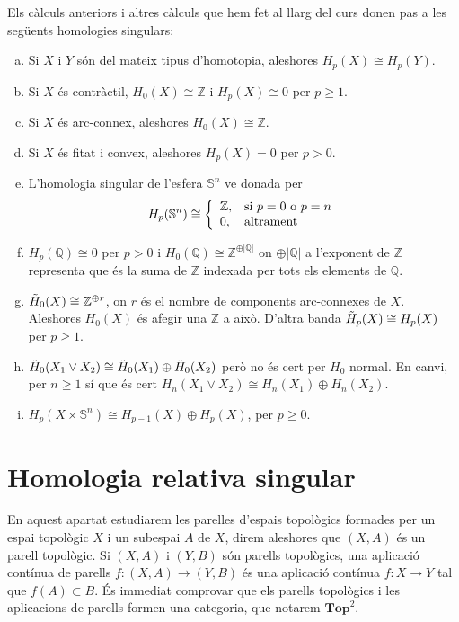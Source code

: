 \documentclass[../main.tex]{subfiles}
\begin{document}
\begin{prop}
 Els càlculs anteriors i altres càlculs que hem fet al llarg del curs donen pas a les següents homologies singulars:
\begin{enumerate}[(a)]
    \item Si $X$ i $Y$ són del mateix tipus d'homotopia, aleshores $H_p(X)\cong H_p(Y)$.
    \item Si $X$ és contràctil, $H_0(X)\cong \mathbb{Z}$ i $H_p(X)\cong 0$ per $p\geq 1$.
    \item Si $X$ és arc-connex, aleshores $H_0(X)\cong\mathbb{Z}$.
    \item Si $X$ és fitat i convex, aleshores $H_p(X) = 0$ per $p>0$.
    \item L'homologia singular de l'esfera $\mathbb{S}^n$ ve donada per
    \begin{equation}
        \notag
        H_p(\mathbb{S}^n)\cong\left\{
        \begin{array}{ll}
            \mathbb{Z}, & \text{si $p = 0$ o $p = n$}\\
            0, & \text{altrament}
        \end{array}
        \right.
    \end{equation}
    \item $H_p(\mathbb{Q})\cong 0$ per $p>0$ i $H_0(\mathbb{Q})\cong\mathbb{Z}^{\oplus|\mathbb{Q}|}$ on $\oplus|\mathbb{Q}|$ a l'exponent de $\mathbb{Z}$ representa que és la suma de $\mathbb{Z}$ indexada per tots els elements de $\mathbb{Q}$.
    \item $\Tilde{H}_0(X)\cong \mathbb{Z}^{\oplus r}$, on $r$ és el nombre de components arc-connexes de $X$. Aleshores $H_0(X)$ és afegir una $\mathbb{Z}$ a això. D'altra banda $\Tilde{H}_p(X)\cong H_p(X)$ per $p\geq 1$.
    \item $\Tilde{H}_0(X_1\vee X_2)\cong \Tilde{H}_0(X_1)\oplus \Tilde{H}_0(X_2)$ però no és cert per $H_0$ normal. En canvi, per $n\geq 1$ sí que és cert $H_n(X_1\vee X_2)\cong H_n(X_1)\oplus H_n(X_2)$.
    \item $H_p(X\times\mathbb{S}^n)\cong H_{p-1}(X)\oplus H_p(X)$, per $p\geq 0$.
\end{enumerate}
\end{prop}



\section{Homologia relativa singular}
En aquest apartat estudiarem les parelles d'espais topològics formades per un espai topològic $X$ i un subespai $A$ de $X$, direm aleshores que $(X,A)$ és un parell topològic. Si $(X,A)$ i $(Y,B)$ són parells topològics, una aplicació contínua de parells $f:(X,A)\rightarrow (Y,B)$ és una aplicació contínua $f:X\rightarrow Y$ tal que $f(A)\subset B$. És immediat comprovar que els parells topològics i les aplicacions de parells formen una categoria, que notarem $\mathbf{Top}^2$.
\end{document}
